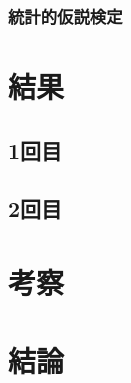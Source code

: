 \documentclass{jlreq}
\begin{document}
\subsubsection*{統計的仮説検定}

\section{結果}
\subsection{1回目}
\subsection{2回目}
\section{考察}
\section{結論}
\begin{thebibliography}{9}

\url{}
\end{thebibliography}
\end{document}
